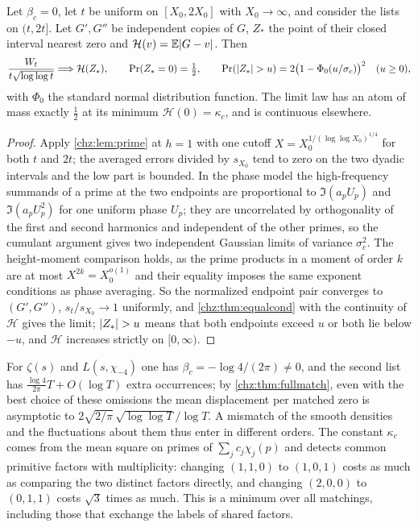 \begin{proposition}\label{chz:prop:randomheight}
Let $\beta_c=0$, let $t$ be uniform on $[X_0,2X_0]$ with $X_0\to\infty$, and consider the lists on $(t,2t]$. Let
$G',G''$ be independent copies of $G$, $Z_*$ the point of their closed interval nearest zero and
$\mathcal H(v)=\mathbb{E}\lvert G-v\rvert$. Then
\[
 \frac{W_t}{t\sqrt{\log\log t}}\Longrightarrow\mathcal H(Z_*),\qquad \Pr(Z_*=0)=\tfrac12,\qquad
 \Pr(\lvert Z_*\rvert>u)=2\bigl(1-\Phi_0(u/\sigma_c)\bigr)^2\quad(u\ge0),
\]
with $\Phi_0$ the standard normal distribution function. The limit law has an atom of mass exactly $\tfrac12$ at its
minimum $\mathcal H(0)=\kappa_c$, and is continuous elsewhere.
\end{proposition}

\begin{proof}
Apply \cref{chz:lem:prime} at $h=1$ with one cutoff $X=X_0^{1/(\log\log X_0)^{1/4}}$ for both $t$ and $2t$; the averaged
errors divided by $s_{X_0}$ tend to zero on the two dyadic intervals and the low part is bounded. In the phase model
the high-frequency summands of a prime at the two endpoints are proportional to $\Im(a_pU_p)$ and $\Im(a_pU_p^2)$
for one uniform phase $U_p$; they are uncorrelated by orthogonality of the first and second harmonics and
independent of the other primes, so the cumulant argument gives two independent Gaussian limits of variance
$\sigma_c^2$. The height-moment comparison holds, as the prime products in a moment of order $k$ are at most
$X^{2k}=X_0^{o(1)}$ and their equality imposes the same exponent conditions as phase averaging. So the normalized
endpoint pair converges to $(G',G'')$, $s_t/s_{X_0}\to1$ uniformly, and \cref{chz:thm:equalcond} with the
continuity of $\mathcal H$ gives the limit; $\lvert Z_*\rvert>u$ means that both endpoints exceed $u$ or both lie below
$-u$, and $\mathcal H$ increases strictly on $[0,\infty)$.
\end{proof}

For $\zeta(s)$ and $L(s,\chi_{-4})$ one has $\beta_c=-\log4/(2\pi)\ne0$, and the second list has
$\frac{\log4}{2\pi}T+O(\log T)$ extra occurrences; by \cref{chz:thm:fullmatch}, even with the best choice of these
omissions the mean displacement per matched zero is asymptotic to $2\sqrt{2/\pi}\,\sqrt{\log\log T}/\log T$. A
mismatch of the smooth densities and the fluctuations about them thus enter in different orders. The constant
$\kappa_c$ comes from the mean square on primes of $\sum_jc_j\chi_j(p)$ and detects common primitive factors with
multiplicity: changing $(1,1,0)$ to $(1,0,1)$ costs as much as comparing the two distinct factors directly, and
changing $(2,0,0)$ to $(0,1,1)$ costs $\sqrt3$ times as much. This is a minimum over all matchings, including
those that exchange the labels of shared factors.

